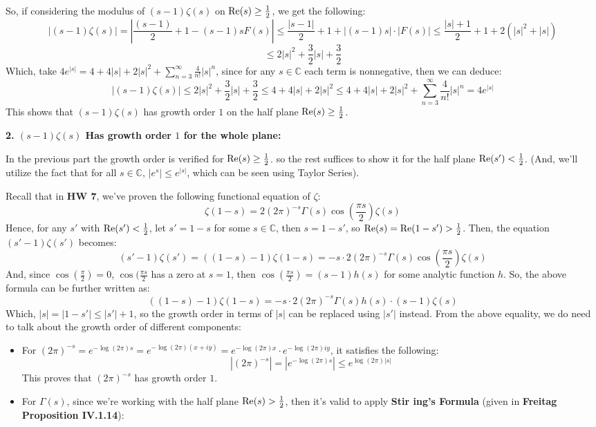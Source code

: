 \documentclass{article}
\begin{document}
\begin{itemize}
    So, if considering the modulus of $(s-1)\zeta(s)$ on $\textmd{Re}(s)\geq \frac{1}{2}$, we get the following:
    $$|(s-1)\zeta(s)| = \left|\frac{(s-1)}{2}+1-(s-1)sF(s)\right|\leq \frac{|s-1|}{2} + 1 + |(s-1)s|\cdot |F(s)| \leq \frac{|s|+1}{2} + 1 + 2(|s|^2+|s|)$$
    $$\leq 2|s|^2 + \frac{3}{2}|s|+\frac{3}{2}$$
    Which, take $4e^{|s|} = 4 + 4|s| + 2|s|^2 + \sum_{n=3}^{\infty}\frac{4}{n!}|s|^n$, since for any $s\in\mathbb{C}$ each term is nonnegative, then we can deduce:
    $$|(s-1)\zeta(s)| \leq 2|s|^2 + \frac{3}{2}|s|+\frac{3}{2} \leq 4+4|s| + 2|s|^2 \leq 4 + 4|s| + 2|s|^2 + \sum_{n=3}^{\infty}\frac{4}{n!}|s|^n = 4e^{|s|}$$
    This shows that $(s-1)\zeta(s)$ has growth order $1$ on the half plane $\textmd{Re}(s)\geq \frac{1}{2}$.

    \hfil

    \textbf{2. $(s-1)\zeta(s)$ Has growth order $1$ for the whole plane:}

    In the previous part the growth order is verified for $\textmd{Re}(s)\geq \frac{1}{2}$. so the rest suffices to show it for the half plane $\textmd{Re}(s')<\frac{1}{2}$. (And, we'll utilize the fact that for all $s\in\mathbb{C}$, $|e^s|\leq e^{|s|}$, which can be seen using Taylor Series).
    
    Recall that in \textbf{HW 7}, we've proven the following functional equation of $\zeta$:
    $$\zeta(1-s) = 2(2\pi)^{-s}\Gamma(s)\cos\left(\frac{\pi s}{2}\right)\zeta(s)$$
    Hence, for any $s'$ with $\textmd{Re}(s')<\frac{1}{2}$, let $s' = 1-s$ for some $s\in\mathbb{C}$, then $s = 1-s'$, so $\textmd{Re}(s) = \textmd{Re}(1-s') > \frac{1}{2}$. Then, the equation $(s'-1)\zeta(s')$ becomes:
    $$(s'-1)\zeta(s') = ((1-s)-1)\zeta(1-s) = -s\cdot 2(2\pi)^{-s}\Gamma(s)\cos\left(\frac{\pi s}{2}\right)\zeta(s)$$
    And, since $\cos(\frac{\pi}{2})=0$, $\cos(\frac{\pi s}{2}$ has a zero at $s=1$, then $\cos\left(\frac{\pi s}{2}\right) = (s-1)h(s)$ for some analytic function $h$. So, the above formula can be further written as:
    $$((1-s)-1)\zeta(1-s) = -s\cdot 2(2\pi)^{-s}\Gamma(s)h(s)\cdot (s-1)\zeta(s)$$
    Which, $|s| = |1-s'| \leq |s'|+1$, so the growth order in terms of $|s|$ can be replaced using $|s'|$ instead. From the above equality, we do need to talk about the growth order of different components:
    \begin{itemize}
        \item For $(2\pi)^{-s} = e^{-\log(2\pi)s} = e^{-\log(2\pi)(x+iy)} = e^{-\log(2\pi)x}\cdot e^{-\log(2\pi)iy}$, it satisfies the following: 
        $$|(2\pi)^{-s}| =  |e^{-\log(2\pi)s}| \leq e^{\log(2\pi)|s|}$$
        This proves that $(2\pi)^{-s}$ has growth order $1$.
        \item For $\Gamma(s)$, since we're working with the half plane $\textmd{Re}(s)>\frac{1}{2}$, then it's valid to apply \textbf{Stir
    ing's Formula} (given in \textbf{Freitag Proposition IV.1.14}): 
        

\end{itemize}
\end{itemize}
\end{document}
